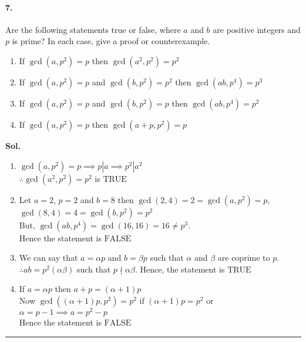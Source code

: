 \documentclass[12pt,oneside,reqno]{amsart}
\begin{document}
\paragraph*{7.} Are the following statements true or false, where $a$ and $b$ are positive integers and $p$ is prime? In each case, give a proof or counterexample.
\begin{enumerate}
    \item If $\gcd{(a, p^2)} = p$ then $\gcd{(a^2, p^2)} = p^2$ 
    \item If $\gcd{(a, p^2)} = p$ and $\gcd{(b, p^2)} = p^2$ then $\gcd{(ab, p^4)} = p^3$
    \item If $\gcd{(a, p^2)} = p$ and $\gcd{(b, p^2)} = p$ then $\gcd{(ab, p^4)} = p^2$
    \item If $\gcd{(a, p^2)} = p$ then $\gcd{(a+p, p^2)} = p$
\end{enumerate}

\bigskip
\textbf{Sol.}
\begin{enumerate}
    \item $\gcd{(a, p^2)} = p \implies p|a \implies p^2|a^2$ \\
           $\therefore \gcd{(a^2, p^2)} = p^2$ is $\boxed{\text{TRUE}}$ \setlength{\parskip}{10pt}

    \item Let $a=2$, $p=2$ and $b=8$ then $\gcd{(2,4)}=2=\gcd{(a, p^2)}=p$, \\ $\gcd{(8,4)}=4=\gcd{(b, p^2)} =p^2$ \\
            But, $\gcd{(ab, p^4)}=\gcd{(16, 16)}=16 \neq p^3$. \\ Hence the statement is $\boxed{\text{FALSE}}$ \setlength{\parskip}{10pt}

    \item  We can say that $a=\alpha p$ and $b=\beta p$ such that $\alpha$ and $\beta$ are coprime to $p$. \\
    $\therefore ab = p^2(\alpha \beta)$ such that $p \nmid \alpha \beta$. Hence, the statement is $\boxed{\text{TRUE}}$ \setlength{\parskip}{10pt}

    \item If $a=\alpha p$ then $a+p=(\alpha+1) p$ \\
        Now $\gcd{((\alpha+1)p, p^2)} = p^2$ if $(\alpha+1)p=p^2$ or $\alpha =p-1 \implies a=p^2-p$ \\
        Hence the statement is $\boxed{\text{FALSE}}$
    
\end{enumerate}


\par\noindent\textcolor{gray}{\rule{\textwidth}{0.5pt}}
\smallskip
\end{document}
